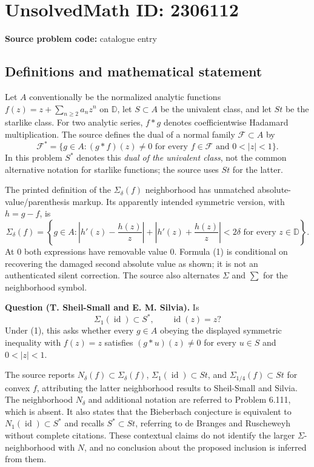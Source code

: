 \documentclass[11pt]{article}
\begin{document}
\section*{UnsolvedMath ID: 2306112}
\textbf{Source problem code:} catalogue entry
\subsection{Definitions and mathematical statement}
Let $A$ conventionally be the normalized analytic functions $f(z)=z+\sum_{n\geq2}a_nz^n$ on $\mathbb D$, let $S\subset A$ be the univalent class, and let $St$ be the starlike class. For two analytic series, $f*g$ denotes coefficientwise Hadamard multiplication. The source defines the dual of a normal family $\mathcal F\subset A$ by
\[
 \mathcal F^*=\{g\in A:(g*f)(z)\ne0\text{ for every }f\in\mathcal F
                              \text{ and }0<|z|<1\}.
\]
In this problem $S^*$ denotes this \emph{dual of the univalent class}, not the common alternative notation for starlike functions; the source uses $St$ for the latter.

The printed definition of the $\Sigma_\delta(f)$ neighborhood has unmatched absolute-value/parenthesis markup. Its apparently intended symmetric version, with $h=g-f$, is
\[
 \Sigma_\delta(f)=\left\{g\in A:
 \left|h'(z)-\frac{h(z)}z\right|+
 \left|h'(z)+\frac{h(z)}z\right|<2\delta
 \text{ for every }z\in\mathbb D\right\}. \tag{1}
\]
At $0$ both expressions have removable value $0$. Formula (1) is conditional on recovering the damaged second absolute value as shown; it is not an authenticated silent correction. The source also alternates $\Sigma$ and $\sum$ for the neighborhood symbol.

\textbf{Question (T. Sheil-Small and E. M. Silvia).} Is
\[
 \Sigma_1(\operatorname{id})\subset S^*,\qquad \operatorname{id}(z)=z?
\]
Under (1), this asks whether every $g\in A$ obeying the displayed symmetric inequality with $f(z)=z$ satisfies $(g*u)(z)\ne0$ for every $u\in S$ and $0<|z|<1$.

The source reports $N_\delta(f)\subset\Sigma_\delta(f)$, $\Sigma_1(\operatorname{id})\subset St$, and $\Sigma_{1/4}(f)\subset St$ for convex $f$, attributing the latter neighborhood results to Sheil-Small and Silvia. The neighborhood $N_\delta$ and additional notation are referred to Problem 6.111, which is absent. It also states that the Bieberbach conjecture is equivalent to $N_1(\operatorname{id})\subset S^*$ and recalls $S^*\subset St$, referring to de Branges and Ruscheweyh without complete citations. These contextual claims do not identify the larger $\Sigma$-neighborhood with $N$, and no conclusion about the proposed inclusion is inferred from them.
\end{document}
